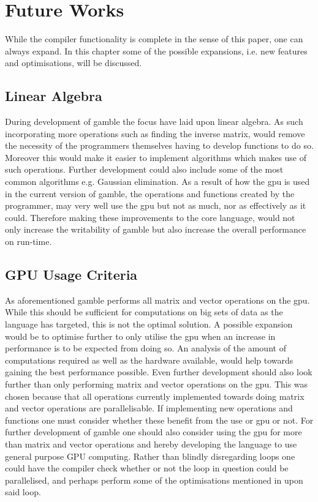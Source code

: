 \chapter{Future Works}\label{cha:future_works}
While the compiler functionality is complete in the sense of this paper, one can always expand.
In this chapter some of the possible expansions, i.e. new features and optimisations, will be discussed.

\section{Linear Algebra}\label{improve:LIAL}
During development of \gls{gamble} the focus have laid upon linear algebra.
As such incorporating more operations such as finding the inverse matrix, would remove the necessity of the programmers themselves having to develop functions to do so.
Moreover this would make it easier to implement algorithms which makes use of such operations.
Further development could also include some of the most common algorithms e.g. Gaussian elimination.
As a result of how the \acrshort{gpu} is used in the current version of \gls{gamble}, the operations and functions created by the programmer, may very well use the \acrshort{gpu} but not as much, nor as effectively as it could.
Therefore making these improvements to the core language, would not only increase the writability of \gls{gamble} but also increase the overall performance on run-time.

\section{GPU Usage Criteria}
As aforementioned \gls{gamble} performs all matrix and vector operations on the \acrshort{gpu}.
While this should be sufficient for computations on big sets of data as the language has targeted, this is not the optimal solution.
A possible expansion would be to optimise further to only utilise the \acrshort{gpu} when an increase in performance is to be expected from doing so.
An analysis of the amount of computations required as well as the hardware available, would help towards gaining the best performance possible.
Even further development should also look further than only performing matrix and vector operations on the \acrshort{gpu}.
This was chosen because that all operations currently implemented towards doing matrix and vector operations are parallelisable.
If implementing new operations and functions one must consider whether these benefit from the use or \acrshort{gpu} or not.
For further development of \gls{gamble} one should also consider using the \acrshort{gpu} for more than matrix and vector operations and hereby developing the language to use general purpose GPU computing. 
Rather than blindly disregarding loops one could have the compiler check whether or not the loop in question could be parallelised, and perhaps perform some of the optimisations mentioned in  upon said loop.
 
